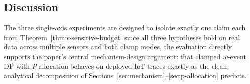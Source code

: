 \subsection{Discussion}

The three single-axis experiments are designed to isolate exactly one claim each from Theorem~\ref{thm:s-sensitive-budget} since all three hypotheses hold on real data across multiple sensors and both clamp modes, the evaluation directly supports the paper's central mechanism-design argument: that clamped $w$-event DP with $P$-allocation behaves on deployed IoT traces exactly as the clean analytical decomposition of Sections~\ref{sec:mechanism}--\ref{sec:p-allocation} predicts.


